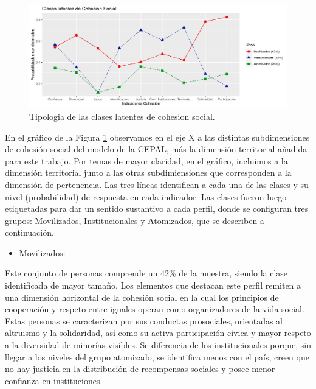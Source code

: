\documentclass[
  12pt,
]{book}
\providecommand{\tightlist}{%
  \setlength{\itemsep}{0pt}\setlength{\parskip}{0pt}}
\begin{document}
\begin{figure}[H]

{\centering \includegraphics[width=1\linewidth,height=1\textheight]{output/graphs/lca3} 

}

\caption{Tipologia de las clases latentes de cohesion social.}\label{fig:clases-latentes}
\end{figure}

En el gráfico de la Figura \ref{fig:clases-latentes} observamos en el eje X a las distintas subdimensiones de cohesión social del modelo de la CEPAL, más la dimensión territorial añadida para este trabajo. Por temas de mayor claridad, en el gráfico, incluimos a la dimensión territorial junto a las otras subdimiensiones que corresponden a la dimensión de pertenencia. Las tres líneas identifican a cada una de las clases y su nivel (probabilidad) de respuesta en cada indicador. Las clases fueron luego etiquetadas para dar un sentido sustantivo a cada perfil, donde se configuran tres grupos: Movilizados, Institucionales y Atomizados, que se describen a continuación.

\begin{itemize}
\tightlist
\item
  Movilizados:
\end{itemize}

Este conjunto de personas comprende un 42\% de la muestra, siendo la clase identificada de mayor tamaño. Los elementos que destacan este perfil remiten a una dimensión horizontal de la cohesión social en la cual los principios de cooperación y respeto entre iguales operan como organizadores de la vida social. Estas personas se caracterizan por sus conductas prosociales, orientadas al altruismo y la solidaridad, así como su activa participación cívica y mayor respeto a la diversidad de minorías visibles. Se diferencia de los institucionales porque, sin llegar a los niveles del grupo atomizado, se identifica menos con el país, creen que no hay justicia en la distribución de recompensas sociales y posee menor confianza en instituciones.
\end{document}
